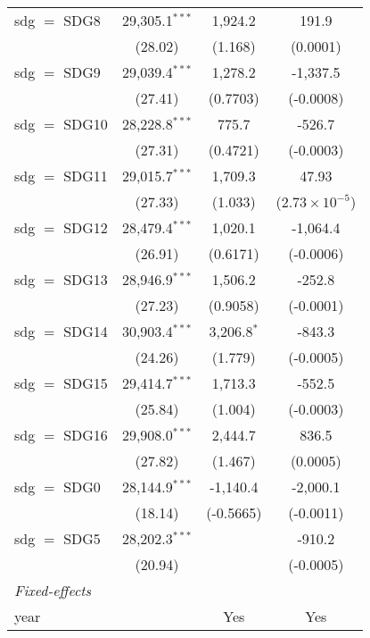 \begin{tabular}{lccc}
   sdg $=$ SDG8  & 29,305.1$^{***}$ & 1,924.2          & 191.9\\   
                 & (28.02)          & (1.168)          & (0.0001)\\   
   sdg $=$ SDG9  & 29,039.4$^{***}$ & 1,278.2          & -1,337.5\\   
                 & (27.41)          & (0.7703)         & (-0.0008)\\   
   sdg $=$ SDG10 & 28,228.8$^{***}$ & 775.7            & -526.7\\   
                 & (27.31)          & (0.4721)         & (-0.0003)\\   
   sdg $=$ SDG11 & 29,015.7$^{***}$ & 1,709.3          & 47.93\\   
                 & (27.33)          & (1.033)          & ($2.73\times 10^{-5}$)\\    
   sdg $=$ SDG12 & 28,479.4$^{***}$ & 1,020.1          & -1,064.4\\   
                 & (26.91)          & (0.6171)         & (-0.0006)\\   
   sdg $=$ SDG13 & 28,946.9$^{***}$ & 1,506.2          & -252.8\\   
                 & (27.23)          & (0.9058)         & (-0.0001)\\   
   sdg $=$ SDG14 & 30,903.4$^{***}$ & 3,206.8$^{*}$    & -843.3\\   
                 & (24.26)          & (1.779)          & (-0.0005)\\   
   sdg $=$ SDG15 & 29,414.7$^{***}$ & 1,713.3          & -552.5\\   
                 & (25.84)          & (1.004)          & (-0.0003)\\   
   sdg $=$ SDG16 & 29,908.0$^{***}$ & 2,444.7          & 836.5\\   
                 & (27.82)          & (1.467)          & (0.0005)\\   
   sdg $=$ SDG0  & 28,144.9$^{***}$ & -1,140.4         & -2,000.1\\   
                 & (18.14)          & (-0.5665)        & (-0.0011)\\   
   sdg $=$ SDG5  & 28,202.3$^{***}$ &                  & -910.2\\   
                 & (20.94)          &                  & (-0.0005)\\   
   \midrule
   \emph{Fixed-effects}\\
   year          &                  & Yes              & Yes\\  

\end{tabular}
